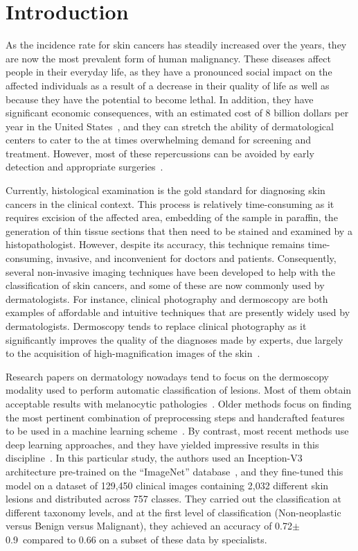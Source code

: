 \documentclass[journal,article,accept,moreauthors,pdftex, applsci]{Definitions/mdpi}
\begin{document}

\section{Introduction}
As the incidence rate for skin cancers has steadily increased over the years, they are now the most prevalent form of human malignancy. These diseases affect people in their everyday life, as they have a pronounced social impact on the affected individuals as a result of a decrease in their quality of life as well as because they have the potential to become lethal. In addition, they have significant economic consequences, with an estimated cost of 8 billion dollars per year in the United States~\cite{Farberg2017a}, and they can stretch the ability of dermatological centers to cater to the at times overwhelming demand for screening and treatment. However, most of these repercussions can be avoided by early detection and appropriate surgeries~\cite{Farberg2017a}.\par
Currently, histological examination is the gold standard for diagnosing skin cancers in the clinical context. This process is relatively time-consuming as it requires excision of the affected area, embedding of the sample in paraffin, the generation of thin tissue sections that then need to be stained and examined by a histopathologist. However, despite its accuracy, this technique remains time-consuming, invasive, and inconvenient for doctors and patients. Consequently, several non-invasive imaging techniques have been developed to help with the classification of skin cancers, and some of these are now commonly used by dermatologists. For instance, clinical photography and dermoscopy are both examples of affordable and intuitive techniques that are presently widely used by dermatologists. Dermoscopy tends to replace clinical photography as it significantly improves the quality of the diagnoses made by experts, due largely to the acquisition of high-magnification images of the skin~\cite{Sinz2017}.\par
Research papers on dermatology nowadays tend to focus on the dermoscopy modality used to perform automatic classification of lesions. Most of them obtain acceptable results with melanocytic pathologies~\cite{Iyatomi2010}. Older methods focus on finding the most pertinent combination of preprocessing steps and handcrafted features to be used in a machine learning scheme~\cite{Rastgoo2015,Pathan2018}. By contrast, most recent methods use deep learning approaches, and they have yielded impressive results in this discipline~\cite{Esteva2017}. In this particular study, the authors used an Inception-V3 architecture pre-trained on the “ImageNet” database~\cite{Deng2008}, and they fine-tuned this model on a dataset of 129,450 clinical images containing 2,032 different skin lesions and distributed across 757 classes. They carried out the classification at different taxonomy levels, and at the first level of classification (Non-neoplastic versus Benign versus Malignant), they achieved an accuracy of 0.72$\pm$0.9\ compared to 0.66 on a subset of these data by specialists.\par
\end{document}
